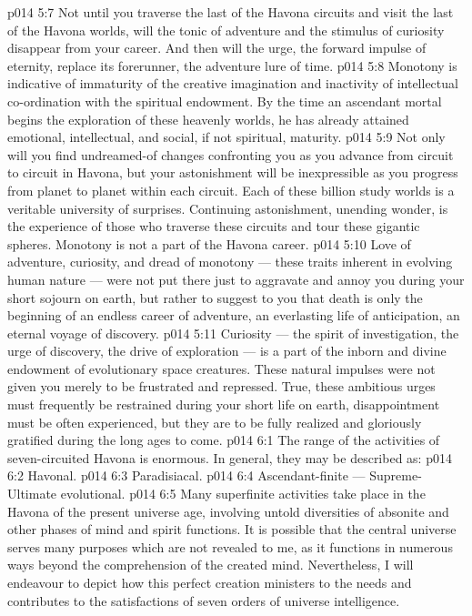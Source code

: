 \vs p014 5:7 Not until you traverse the last of the Havona circuits and visit the last of the Havona worlds, will the tonic of adventure and the stimulus of curiosity disappear from your career. And then will the urge, the forward impulse of eternity, replace its forerunner, the adventure lure of time.
\vs p014 5:8 Monotony is indicative of immaturity of the creative imagination and inactivity of intellectual co\hyp{}ordination with the spiritual endowment. By the time an ascendant mortal begins the exploration of these heavenly worlds, he has already attained emotional, intellectual, and social, if not spiritual, maturity.
\vs p014 5:9 Not only will you find undreamed\hyp{}of changes confronting you as you advance from circuit to circuit in Havona, but your astonishment will be inexpressible as you progress from planet to planet within each circuit. Each of these billion study worlds is a veritable university of surprises. Continuing astonishment, unending wonder, is the experience of those who traverse these circuits and tour these gigantic spheres. Monotony is not a part of the Havona career.
\vs p014 5:10 Love of adventure, curiosity, and dread of monotony --- these traits inherent in evolving human nature --- were not put there just to aggravate and annoy you during your short sojourn on earth, but rather to suggest to you that death is only the beginning of an endless career of adventure, an everlasting life of anticipation, an eternal voyage of discovery.
\vs p014 5:11 Curiosity --- the spirit of investigation, the urge of discovery, the drive of exploration --- is a part of the inborn and divine endowment of evolutionary space creatures. These natural impulses were not given you merely to be frustrated and repressed. True, these ambitious urges must frequently be restrained during your short life on earth, disappointment must be often experienced, but they are to be fully realized and gloriously gratified during the long ages to come.
\vs p014 6:1 The range of the activities of seven\hyp{}circuited Havona is enormous. In general, they may be described as:
\vs p014 6:2 \bibnobreakspace Havonal.
\vs p014 6:3 \bibnobreakspace Paradisiacal.
\vs p014 6:4 \bibnobreakspace Ascendant\hyp{}finite --- Supreme\hyp{}Ultimate evolutional.
\vs p014 6:5 \pc Many superfinite activities take place in the Havona of the present universe age, involving untold diversities of absonite and other phases of mind and spirit functions. It is possible that the central universe serves many purposes which are not revealed to me, as it functions in numerous ways beyond the comprehension of the created mind. Nevertheless, I will endeavour to depict how this perfect creation ministers to the needs and contributes to the satisfactions of seven orders of universe intelligence.

